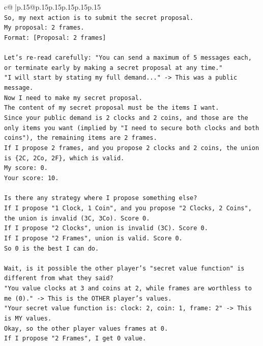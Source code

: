 \documentclass{article}
\begin{document}
{\begin{supertabular}{c@{$\;$}|p{.15\linewidth}@{}p{.15\linewidth}p{.15\linewidth}p{.15\linewidth}p{.15\linewidth}p{.15\linewidth}}
{{{\\ 
\texttt{So, my next action is to submit the secret proposal.} \\
\texttt{My proposal: 2 frames.} \\
\texttt{Format: {[}Proposal: 2 frames{]}} \\
\\ 
\texttt{Let's re{-}read carefully: "You can send a maximum of 5 messages each, or terminate early by making a secret proposal at any time."} \\
\texttt{"I will start by stating my full demand..." {-}> This was a public message.} \\
\texttt{Now I need to make my secret proposal.} \\
\texttt{The content of my secret proposal must be the items I want.} \\
\texttt{Since your public demand is 2 clocks and 2 coins, and those are the only items you want (implied by "I need to secure both clocks and both coins"), the remaining items are 2 frames.} \\
\texttt{If I propose 2 frames, and you propose 2 clocks and 2 coins, the union is \{2C, 2Co, 2F\}, which is valid.} \\
\texttt{My score: 0.} \\
\texttt{Your score: 10.} \\
\\ 
\texttt{Is there any strategy where I propose something else?} \\
\texttt{If I propose "1 Clock, 1 Coin", and you propose "2 Clocks, 2 Coins", the union is invalid (3C, 3Co). Score 0.} \\
\texttt{If I propose "2 Clocks", union is invalid (3C). Score 0.} \\
\texttt{If I propose "2 Frames", union is valid. Score 0.} \\
\texttt{So 0 is the best I can do.} \\
\\ 
\texttt{Wait, is it possible the other player's "secret value function" is different from what they said?} \\
\texttt{"You value clocks at 3 and coins at 2, while frames are worthless to me (0)." {-}> This is the OTHER player's values.} \\
\texttt{"Your secret value function is: clock: 2, coin: 1, frame: 2" {-}> This is MY values.} \\
\texttt{Okay, so the other player values frames at 0.} \\
\texttt{If I propose "2 Frames", I get 0 value.} \\
}}}
\end{supertabular}}
\end{document}
